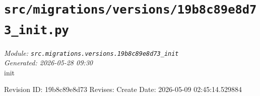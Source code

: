 
\section{\texttt{src/migrations/versions/19b8c89e8d73\_init.py}}
\textit{Module: \texttt{src.migrations.versions.19b8c89e8d73\_init}} \\
\textit{Generated: 2026-05-28 09:30} \\

init

Revision ID: 19b8c89e8d73
Revises:
Create Date: 2026-05-09 02:45:14.529884
